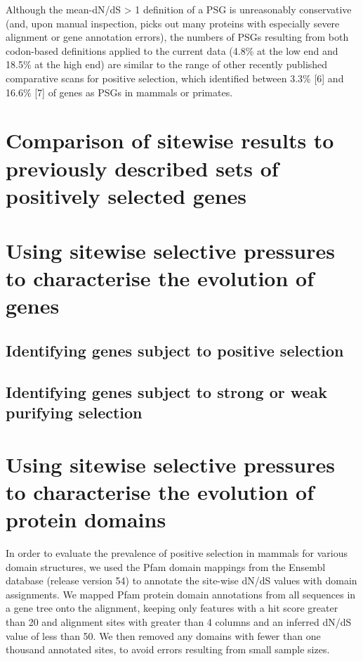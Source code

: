 Although the mean-dN/dS > 1 definition of a PSG is unreasonably
conservative (and, upon manual inspection, picks out many proteins
with especially severe alignment or gene annotation errors), the
numbers of PSGs resulting from both codon-based definitions applied to
the current data (4.8\% at the low end and 18.5\% at the high end) are
similar to the range of other recently published comparative scans for
positive selection, which identified between 3.3\% [6] and 16.6\% [7]
of genes as PSGs in mammals or primates.


\section{Comparison of sitewise results to previously described sets of positively selected genes}

\section{Using sitewise selective pressures to characterise the evolution of genes}
\subsection{Identifying genes subject to positive selection}
\subsection{Identifying genes subject to strong or weak purifying selection}

\section{Using sitewise selective pressures to characterise the evolution of protein domains}


In order to evaluate the prevalence of positive selection in mammals
for various domain structures, we used the Pfam domain mappings from
the Ensembl database (release version 54) to annotate the site-wise
dN/dS values with domain assignments. We mapped Pfam protein domain
annotations from all sequences in a gene tree onto the alignment,
keeping only features with a hit score greater than 20 and alignment
sites with greater than 4 columns and an inferred dN/dS value of less
than 50. We then removed any domains with fewer than one thousand
annotated sites, to avoid errors resulting from small sample sizes.

